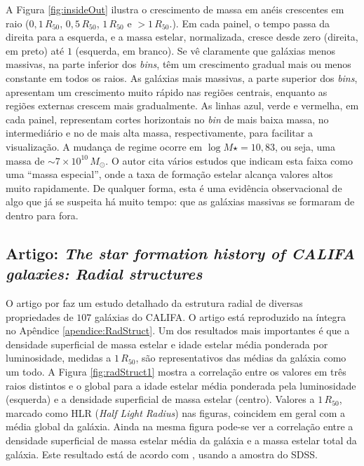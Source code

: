 A Figura \ref{fig:insideOut} ilustra o crescimento de massa em anéis crescentes
em raio ($0,1\,R_{50}$, $0,5\,R_{50}$, $1\,R_{50}$ e $>1\,R_{50}$.). Em cada
painel, o tempo passa da direita para a esquerda, e a massa estelar,
normalizada, cresce desde zero (direita, em preto) até $1$ (esquerda, em
branco). Se vê claramente que galáxias menos massivas, na parte inferior dos
{\em bins}, têm um crescimento gradual mais ou menos constante em todos os
raios. As galáxias mais massivas, a parte superior dos {\em bins}, apresentam um
crescimento muito rápido nas regiões centrais, enquanto as regiões externas
crescem mais gradualmente. As linhas azul, verde e vermelha, em cada painel,
representam cortes horizontais no {\em bin} de mais baixa massa, no
intermediário e no de mais alta massa, respectivamente, para facilitar a
visualização. A mudança de regime ocorre em $\log M\star = 10,83$, ou seja, uma
massa de $\sim 7\times10^{10}\,M_\odot$. O autor cita vários estudos que indicam
esta faixa como uma ``massa especial'', onde a taxa de formação estelar alcança
valores altos muito rapidamente. De qualquer forma, esta é uma evidência
observacional de algo que já se suspeita há muito tempo:
que as galáxias massivas se formaram de dentro para fora.



\subsection{Artigo: {\em The star formation history of CALIFA galaxies: Radial
structures}}
\label{sec:pycasso:art:RadStruct}

O artigo por \citet{GonzalezDelgado2013} faz um estudo detalhado da estrutura
radial de diversas propriedades de $107$ galáxias do CALIFA. O artigo está
reproduzido na íntegra no Apêndice \ref{apendice:RadStruct}.
Um dos resultados mais importantes é que a densidade superficial de massa
estelar e idade estelar média ponderada por luminosidade, medidas a $1\,R_{50}$,
são representativos das médias da galáxia como um todo. A Figura
\ref{fig:radStruct1} mostra a correlação entre os valores em três raios
distintos e o global para a idade estelar média ponderada pela luminosidade
(esquerda) e a densidade superficial de massa estelar (centro). Valores a
$1\,R_{50}$, marcado como HLR ({\em Half Light Radius}) nas figuras, coincidem
em geral com a média global da galáxia.
Ainda na mesma figura pode-se ver a correlação entre a densidade superficial de
massa estelar média da galáxia e a massa estelar total da galáxia. Este
resultado está de acordo com \citet{Kauffmann2003}, usando a amostra do SDSS.

